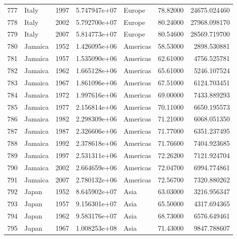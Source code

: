 \documentclass[
  letterpaper,
  DIV=11,
  numbers=noendperiod]{scrreprt}
\begin{document}
\begin{tabular}{llrrlrr}
777  &                     Italy &  1997 &  5.747947e+07 &    Europe &  78.82000 &   24675.024460 \\
778  &                     Italy &  2002 &  5.792700e+07 &    Europe &  80.24000 &   27968.098170 \\
779  &                     Italy &  2007 &  5.814773e+07 &    Europe &  80.54600 &   28569.719700 \\
780  &                   Jamaica &  1952 &  1.426095e+06 &  Americas &  58.53000 &    2898.530881 \\
781  &                   Jamaica &  1957 &  1.535090e+06 &  Americas &  62.61000 &    4756.525781 \\
782  &                   Jamaica &  1962 &  1.665128e+06 &  Americas &  65.61000 &    5246.107524 \\
783  &                   Jamaica &  1967 &  1.861096e+06 &  Americas &  67.51000 &    6124.703451 \\
784  &                   Jamaica &  1972 &  1.997616e+06 &  Americas &  69.00000 &    7433.889293 \\
785  &                   Jamaica &  1977 &  2.156814e+06 &  Americas &  70.11000 &    6650.195573 \\
786  &                   Jamaica &  1982 &  2.298309e+06 &  Americas &  71.21000 &    6068.051350 \\
787  &                   Jamaica &  1987 &  2.326606e+06 &  Americas &  71.77000 &    6351.237495 \\
788  &                   Jamaica &  1992 &  2.378618e+06 &  Americas &  71.76600 &    7404.923685 \\
789  &                   Jamaica &  1997 &  2.531311e+06 &  Americas &  72.26200 &    7121.924704 \\
790  &                   Jamaica &  2002 &  2.664659e+06 &  Americas &  72.04700 &    6994.774861 \\
791  &                   Jamaica &  2007 &  2.780132e+06 &  Americas &  72.56700 &    7320.880262 \\
792  &                     Japan &  1952 &  8.645902e+07 &      Asia &  63.03000 &    3216.956347 \\
793  &                     Japan &  1957 &  9.156301e+07 &      Asia &  65.50000 &    4317.694365 \\
794  &                     Japan &  1962 &  9.583176e+07 &      Asia &  68.73000 &    6576.649461 \\
795  &                     Japan &  1967 &  1.008253e+08 &      Asia &  71.43000 &    9847.788607 \\

\end{tabular}
\end{document}

